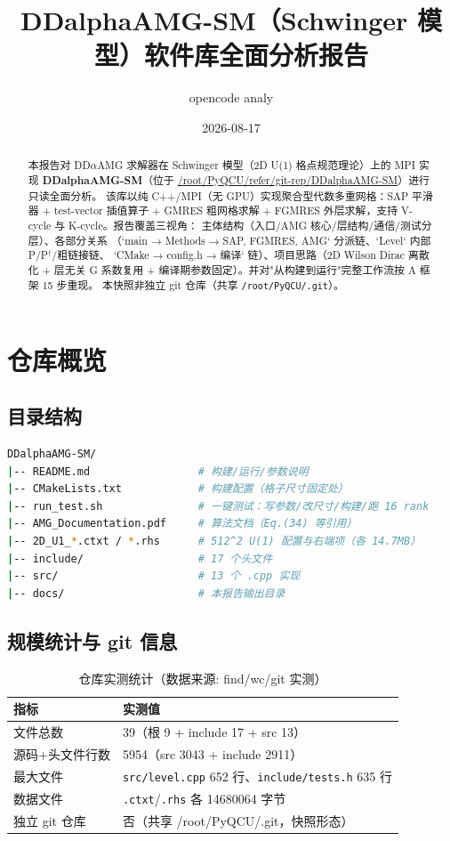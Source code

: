 \documentclass[UTF8]{ctexart}
\title{DDalphaAMG-SM（Schwinger 模型）软件库全面分析报告}
\author{opencode analy}
\date{2026-08-17}
\begin{document}
\maketitle

\begin{abstract}
本报告对 DD$\alpha$AMG 求解器在 Schwinger 模型（2D U(1) 格点规范理论）上的 MPI 实现
\textbf{DDalphaAMG-SM}（位于 \url{/root/PyQCU/refer/git-rep/DDalphaAMG-SM}）进行只读全面分析。
该库以纯 C++/MPI（无 GPU）实现聚合型代数多重网格：SAP 平滑器 + test-vector 插值算子 + GMRES
粗网格求解 + FGMRES 外层求解，支持 V-cycle 与 K-cycle。报告覆盖三视角：
\textcolor{struct}{主体结构}（入口/AMG 核心/层结构/通信/测试分层）、\textcolor{relation}{各部分关系}
（`main → Methods → {SAP, FGMRES, AMG}` 分派链、`Level` 内部 P/P$^\dagger$/粗链接链、
`CMake → config.h → 编译` 链）、\textcolor{idea}{项目思路}（2D Wilson Dirac 离散化 +
层无关 G 系数复用 + 编译期参数固定）。并对"从构建到运行"完整工作流按 A 框架 15 步重现。
本快照非独立 git 仓库（共享 \texttt{/root/PyQCU/.git}）。
\end{abstract}

\tableofcontents

\section{仓库概览}

\subsection{目录结构}
\begin{lstlisting}[language=bash]
DDalphaAMG-SM/
|-- README.md                 # 构建/运行/参数说明
|-- CMakeLists.txt            # 构建配置（格子尺寸固定处）
|-- run_test.sh               # 一键测试：写参数/改尺寸/构建/跑 16 rank
|-- AMG_Documentation.pdf     # 算法文档（Eq.(34) 等引用）
|-- 2D_U1_*.ctxt / *.rhs      # 512^2 U(1) 配置与右端项（各 14.7MB）
|-- include/                  # 17 个头文件
|-- src/                      # 13 个 .cpp 实现
|-- docs/                     # 本报告输出目录
\end{lstlisting}

\subsection{规模统计与 git 信息}
\begin{table}[htbp]\centering
\begin{tabular}{ll}
\toprule
指标 & 实测值 \\
\midrule
文件总数 & 39（根 9 + include 17 + src 13） \\
源码+头文件行数 & 5954（src 3043 + include 2911） \\
最大文件 & \texttt{\nolinkurl{src/level.cpp}} 652 行、\texttt{\nolinkurl{include/tests.h}} 635 行 \\
数据文件 & \texttt{.ctxt}/\texttt{.rhs} 各 14680064 字节 \\
独立 git 仓库 & 否（共享 /root/PyQCU/.git，快照形态） \\
\bottomrule
\end{tabular}
\caption{仓库实测统计（数据来源: find/wc/git 实测）}
\end{table}
\end{document}
